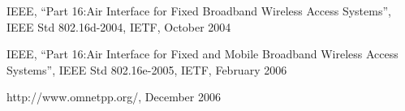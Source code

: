 \newpage

\newcommand{\rfc}[1]{\href{http://tools.ietf.org/html/rfc#1}{RFC#1}}
\begin{thebibliography}{1}

 IEEE, ``Part 16:Air Interface for Fixed 
  Broadband Wireless Access Systems'', IEEE Std 802.16d-2004, IETF,
  October 2004

 IEEE, ``Part 16:Air Interface for Fixed and Mobile
  Broadband Wireless Access Systems'', IEEE Std 802.16e-2005, IETF,
  February 2006

 http://www.omnetpp.org/, December 2006

\end{thebibliography}

